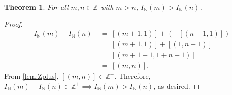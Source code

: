 \documentclass[10pt]{article}
\newtheorem{theorem}{Theorem}[section]
\theoremstyle{definition}
\theoremstyle{remark}
\newcommand{\IdN}{I_{\mathbb{N}}}
\begin{document}
        \begin{theorem}
                For all $m, n \in \mathbb{Z}$ with $m > n$, $\IdN(m) > \IdN(n)$.
        \end{theorem}
        \begin{proof}
                \begin{align*}
                \IdN(m) - \IdN(n) \;&=\; [(m + 1, 1)] + (-[(n + 1, 1)]) \\
                        \;&=\; [(m + 1, 1)] + [(1, n + 1)] \\
                        \;&=\; [(m + 1 + 1, 1 + n + 1)] \\
                        \;&=\; [(m, n)].
                \end{align*}
                From \ref{lem:Zplus}, $[(m, n)] \in \mathbb{Z}^+$.
                Therefore, $\IdN(m) - \IdN(n) \in \mathbb{Z}^+ \implies \IdN(m) > \IdN(n)$, as desired.
        \end{proof}
\end{document}
